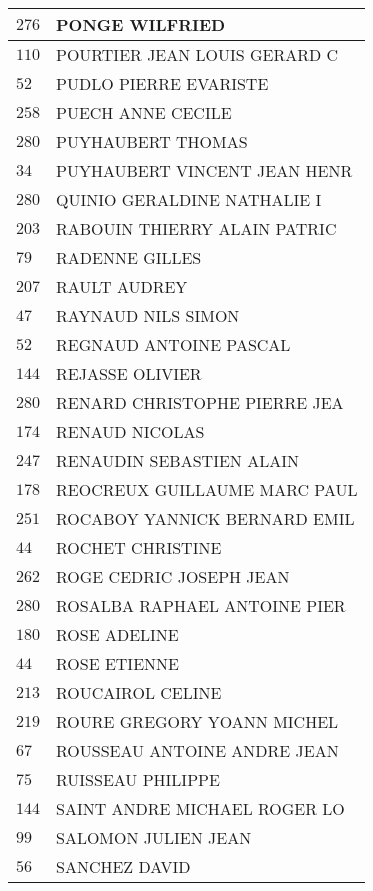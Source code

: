 \begin{xltabular}{\linewidth}{|l|X|}
    \hline
    $276$ & PONGE WILFRIED \\
    \hline
    $110$ & POURTIER JEAN LOUIS GERARD C \\
    \hline
    $52$ & PUDLO PIERRE EVARISTE \\
    \hline
    $258$ & PUECH ANNE CECILE \\
    \hline
    $280$ & PUYHAUBERT THOMAS \\
    \hline
    $34$ & PUYHAUBERT VINCENT JEAN HENR \\
    \hline
    $280$ & QUINIO GERALDINE NATHALIE I \\
    \hline
    $203$ & RABOUIN THIERRY ALAIN PATRIC \\
    \hline
    $79$ & RADENNE GILLES \\
    \hline
    $207$ & RAULT AUDREY \\
    \hline
    $47$ & RAYNAUD NILS SIMON \\
    \hline
    $52$ & REGNAUD ANTOINE PASCAL \\
    \hline
    $144$ & REJASSE OLIVIER \\
    \hline
    $280$ & RENARD CHRISTOPHE PIERRE JEA \\
    \hline
    $174$ & RENAUD NICOLAS \\
    \hline
    $247$ & RENAUDIN SEBASTIEN ALAIN \\
    \hline
    $178$ & REOCREUX GUILLAUME MARC PAUL \\
    \hline
    $251$ & ROCABOY YANNICK BERNARD EMIL \\
    \hline
    $44$ & ROCHET CHRISTINE \\
    \hline
    $262$ & ROGE CEDRIC JOSEPH JEAN \\
    \hline
    $280$ & ROSALBA RAPHAEL ANTOINE PIER \\
    \hline
    $180$ & ROSE ADELINE \\
    \hline
    $44$ & ROSE ETIENNE \\
    \hline
    $213$ & ROUCAIROL CELINE \\
    \hline
    $219$ & ROURE GREGORY YOANN MICHEL \\
    \hline
    $67$ & ROUSSEAU ANTOINE ANDRE JEAN \\
    \hline
    $75$ & RUISSEAU PHILIPPE \\
    \hline
    $144$ & SAINT ANDRE MICHAEL ROGER LO \\
    \hline
    $99$ & SALOMON JULIEN JEAN \\
    \hline
    $56$ & SANCHEZ DAVID \\

\end{xltabular}
